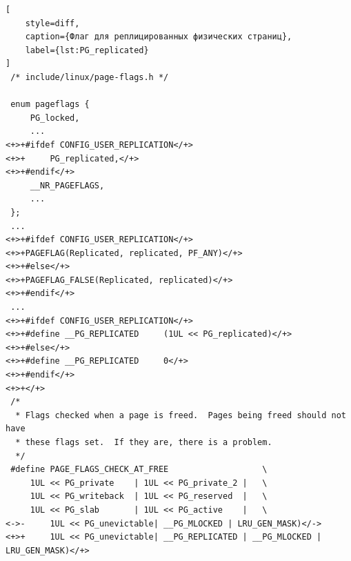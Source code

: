 \begin{lstlisting}[
	style=diff,
	caption={Флаг для реплицированных физических страниц},
	label={lst:PG_replicated}
]
 /* include/linux/page-flags.h */

 enum pageflags {
	 PG_locked,
	 ...
<+>+#ifdef CONFIG_USER_REPLICATION</+>
<+>+	 PG_replicated,</+>
<+>+#endif</+>
 	 __NR_PAGEFLAGS,
	 ...
 };
 ...
<+>+#ifdef CONFIG_USER_REPLICATION</+>
<+>+PAGEFLAG(Replicated, replicated, PF_ANY)</+>
<+>+#else</+>
<+>+PAGEFLAG_FALSE(Replicated, replicated)</+>
<+>+#endif</+>
 ...
<+>+#ifdef CONFIG_USER_REPLICATION</+>
<+>+#define __PG_REPLICATED		(1UL << PG_replicated)</+>
<+>+#else</+>
<+>+#define __PG_REPLICATED		0</+>
<+>+#endif</+>
<+>+</+>
 /*
  * Flags checked when a page is freed.  Pages being freed should not have
  * these flags set.  If they are, there is a problem.
  */
 #define PAGE_FLAGS_CHECK_AT_FREE					\
 	 1UL << PG_private    | 1UL << PG_private_2 |	\
 	 1UL << PG_writeback  | 1UL << PG_reserved  |	\
 	 1UL << PG_slab       | 1UL << PG_active    |	\
<->-	 1UL << PG_unevictable| __PG_MLOCKED | LRU_GEN_MASK)</->
<+>+	 1UL << PG_unevictable| __PG_REPLICATED | __PG_MLOCKED | LRU_GEN_MASK)</+>
\end{lstlisting}
\vspace{0.5cm}


